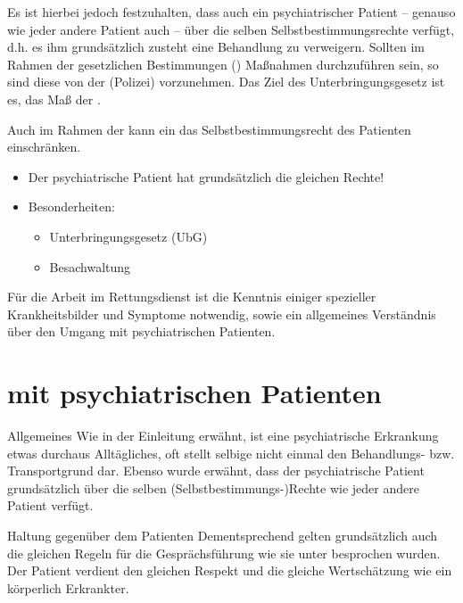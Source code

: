 {%
Es ist hierbei jedoch festzuhalten, dass auch ein
psychiatrischer Patient -- genauso wie jeder andere Patient
auch -- über die selben Selbstbestimmungsrechte verfügt,
d.h. es ihm grundsätzlich zusteht eine Behandlung zu
verweigern. Sollten im Rahmen der gesetzlichen Bestimmungen
() Maßnahmen durchzuführen sein, so
sind diese von der  (Polizei) vorzunehmen. Das
Ziel des Unterbringungsgesetz ist es, das Maß der
.

Auch im Rahmen der
 kann ein  das Selbstbestimmungsrecht des
Patienten einschränken. 
}{
\begin{itemize}
  \item Der psychiatrische Patient hat grundsätzlich die gleichen Rechte!
  \item Besonderheiten:
  \begin{itemize}
    \item Unterbringungsgesetz (UbG)
    \item Besachwaltung
  \end{itemize}
\end{itemize}
}{}{}{}


\begin{Synopsis}
\end{Synopsis}

Für die Arbeit im Rettungsdienst ist die Kenntnis einiger
spezieller Krankheitsbilder und Symptome notwendig, sowie
ein allgemeines Verständnis über den Umgang mit
psychiatrischen Patienten.

\section{ mit psychiatrischen Patienten}
\label{topic:umgang-psy}

\Text
{Allgemeines}%
{%
Wie in der Einleitung erwähnt, ist eine psychiatrische
Erkrankung etwas durchaus Alltägliches, oft stellt selbige
nicht einmal den Behandlungs- bzw. Transportgrund dar.
Ebenso wurde erwähnt, dass der psychiatrische Patient
grundsätzlich über die selben (Selbstbestimmungs-)Rechte
wie jeder andere Patient verfügt. 
}%


\Text
{Haltung gegenüber dem Patienten}%
{%
Dementsprechend
gelten grundsätzlich auch die gleichen Regeln für die
Gesprächsführung wie sie unter
 besprochen wurden. Der
Patient verdient den gleichen Respekt und die gleiche
Wertschätzung wie ein körperlich Erkrankter.
}%


